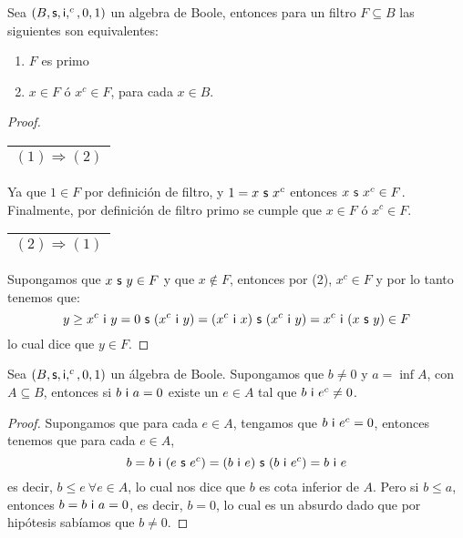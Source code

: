   \begin{lemma} \label{lemma_26}
    \PN Sea $(B, \mathsf{s}, \mathsf{i}, ^{c}, 0, 1)$ un algebra de Boole, entonces para un filtro $F \subseteq B$ las siguientes son equivalentes:
    \begin{enumerate}[(1)]
      \item $F$ es primo
      \item $x \in F$ ó $x^{c} \in F$, para cada $x \in B$.
    \end{enumerate}
  \end{lemma}
  \begin{proof}
    \begin{tabular}{|c|} \hline $(1) \Rightarrow (2)$\\\hline \end{tabular} Ya que $1 \in F$ por definición de filtro,
      y $1 = x \ \SU \ x^{c}$ entonces $x \ \mathsf{s} \ x^{c} \in F$. Finalmente, por definición de filtro primo se cumple que
      $x \in F$ ó $x^{c} \in F$.

    \vspace{3mm}
    \begin{tabular}{|c|} \hline $(2) \Rightarrow (1)$\\\hline \end{tabular} Supongamos que $x \ \mathsf{s} \ y \in F$ y que
    $x \notin F$, entonces por (2), $x^{c} \in F$ y por lo tanto tenemos que:
    \[
      y \geq x^{c} \ \IN \ y = 0 \ \SU \ (x^{c} \ \IN \ y) = (x^{c} \ \IN \ x) \ \SU \ (x^{c} \ \IN \ y) = x^{c} \ \IN \
      (x \ \SU \ y) \in F
    \]
    \PN lo cual dice que $y \in F$.
  \end{proof}

  \begin{lemma} \label{lemma_27}
    \PN Sea $(B, \mathsf{s}, \mathsf{i}, ^{c}, 0, 1)$ un álgebra de Boole. Supongamos que $b \neq 0$ y $a = \inf A$, con $A \subseteq B$, entonces si $b
    \ \mathsf{i} \ a = 0$ existe un $e \in A$ tal que $b \ \mathsf{i} \ e^{c} \neq 0$.
  \end{lemma}
  \begin{proof}
    \PN Supongamos que para cada $e \in A$, tengamos que $b \ \mathsf{i} \ e^{c} = 0$, entonces tenemos que para cada
    $e \in A$,
    \[
      b = b \ \mathsf{i} \ (e \ \mathsf{s} \ e^{c}) = (b \ \mathsf{i} \ e)\ \mathsf{s} \ (b \ \mathsf{i} \ e^{c}) = b \ \mathsf{i} \ e
    \]
    \PN es decir, $b \leq e \ \forall e \in A$, lo cual nos dice que $b$ es cota inferior de $A$. Pero si $b \leq a$,
    entonces $b = b \ \mathsf{i} \ a = 0$, es decir, $b = 0$, lo cual es un absurdo dado que por hipótesis sabíamos que
    $b \neq 0$.
  \end{proof}

